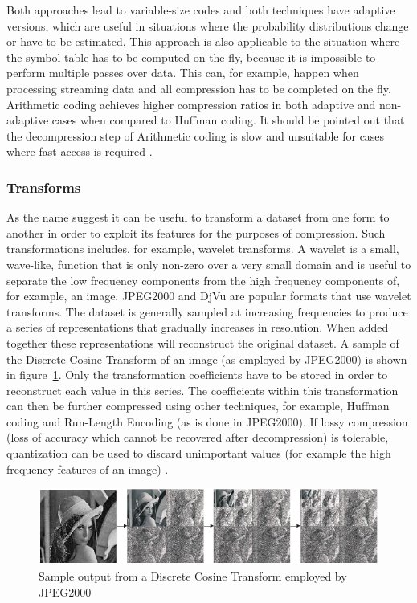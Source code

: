 Both approaches lead to variable-size codes and both techniques have adaptive versions, which are useful in situations where the probability distributions change or have to be estimated. 
This approach is also applicable to the situation where the symbol table has to be computed on the fly, because it is impossible to perform multiple passes over data. This can, for example,
happen when processing streaming data and all compression has to be completed on the fly. Arithmetic coding achieves higher compression ratios in both adaptive and non-adaptive cases 
when compared to Huffman coding. It should be pointed out that the decompression step of Arithmetic coding is slow and unsuitable for cases where fast access is 
required \cite{ray1995database,williams1999compressing}\cite[ch. 2]{salomon2004data}.

\subsubsection{Transforms}
As the name suggest it can be useful to transform a dataset from one form to another in order to exploit its features for the purposes of compression. Such transformations 
includes, for example, wavelet transforms. A wavelet is a small, wave-like, function that is only non-zero over a very small domain and is useful
to separate the low frequency components from the high frequency components of, for example, an image. JPEG2000 and DjVu are popular formats that use 
wavelet transforms. The dataset is generally sampled at increasing frequencies to produce a series of representations that gradually increases in resolution. When added together 
these representations will reconstruct the original dataset. A sample of the Discrete Cosine Transform of an image (as employed by JPEG2000) is shown in figure~\ref{TRANSFORM_SAMPLE}. 
Only the transformation coefficients have to be stored in order to reconstruct each value in this series. The coefficients within this transformation can then be further compressed 
using other techniques, for example, Huffman coding and Run-Length Encoding (as is done in JPEG2000). If lossy compression (loss of accuracy which cannot be recovered after 
decompression) is tolerable, quantization can be used to discard unimportant values (for example the high frequency features of an image) \cite{952804}\cite[ch. 5]{salomon2004data}.
\begin{figure}[h!]
\begin{mdframed}
 \centering
 \includegraphics[width=1.0\textwidth]{DCTSample.png}
 \caption{Sample output from a Discrete Cosine Transform employed by JPEG2000 \cite{952804}}
 \label{TRANSFORM_SAMPLE}
\end{mdframed}
\end{figure}

